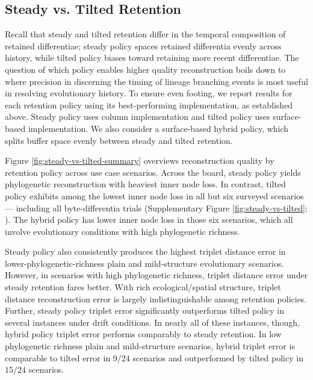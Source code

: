
\subsection{Steady vs. Tilted Retention} \label{sec:steady-vs-tilted}



Recall that steady and tilted retention differ in the temporal composition of retained differentiae;
steady policy spaces retained differentia evenly across history, while tilted policy biases toward retaining more recent differentiae.
The question of which policy enables higher quality reconstruction boils down to where precision in discerning the timing of lineage branching events is most useful in resolving evolutionary history.
To ensure even footing, we report results for each retention policy using its best-performing implementation, as established above.
Steady policy uses column implementation and tilted policy uses surface-based implementation.
We also consider a surface-based hybrid policy, which splits buffer space evenly between steady and tilted retention.

Figure \ref{fig:steady-vs-tilted-summary} overviews reconstruction quality by retention policy across use case scenarios.
Across the board, steady policy yields phylogenetic reconstruction with heaviest inner node loss.
In contrast, tilted policy exhibits among the lowest inner node loss in all but six surveyed scenarios --- including all byte-differentia trials (Supplementary Figure \ref{fig:steady-vs-tilted}; \citep{moreno2024supplemental}).
The hybrid policy has lower inner node loss in those six scenarios, which all involve evolutionary conditions with high phylogenetic richness.

Steady policy also consistently produces the highest triplet distance error in lower-phylogenetic-richness plain and mild-structure evolutionary scenarios.
However, in scenarios with high phylogenetic richness, triplet distance error under steady retention fares better.
With rich ecological/spatial structure, triplet distance reconstruction error is largely indistinguishable among retention policies.
Further, steady policy triplet error significantly outperforms tilted policy in several instances under drift conditions.
In nearly all of these instances, though, hybrid policy triplet error performs comparably to steady retention.
In low phylogenetic richness plain and mild-structure scenarios, hybrid triplet error is comparable to tilted error in $9 / 24$ scenarios and outperformed by tilted policy in $15 / 24$ scenarios.


